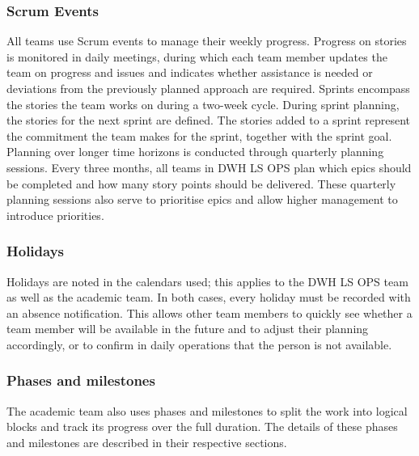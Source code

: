\subsubsection*{Scrum Events}
All teams use Scrum events to manage their weekly progress. Progress on stories is monitored in daily meetings, during which each team member updates the team on progress and issues and indicates whether assistance is needed or deviations from the previously planned approach are required. Sprints encompass the stories the team works on during a two-week cycle. During sprint planning, the stories for the next sprint are defined. The stories added to a sprint represent the commitment the team makes for the sprint, together with the sprint goal. Planning over longer time horizons is conducted through quarterly planning sessions. Every three months, all teams in DWH LS OPS plan which \gls{epic}s should be completed and how many story points should be delivered. These quarterly planning sessions also serve to prioritise epics and allow higher management to introduce priorities.



\subsubsection*{Holidays}
Holidays are noted in the calendars used; this applies to the DWH LS OPS team as well as the academic team. In both cases, every holiday must be recorded with an absence notification. This allows other team members to quickly see whether a team member will be available in the future and to adjust their planning accordingly, or to confirm in daily operations that the person is not available.

\subsubsection*{Phases and milestones}
The academic team also uses phases and milestones to split the work into logical blocks and track its progress over the full duration. The details of these phases and milestones are described in their respective sections.

